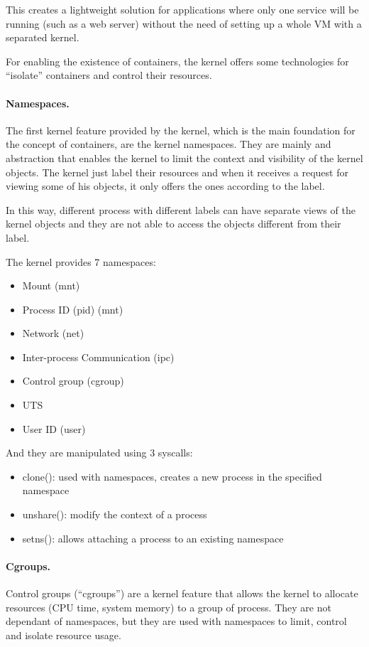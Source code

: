 This creates a lightweight solution for applications where only one service will be running (such as a web server) without the need of setting up a whole VM with a separated kernel.

For enabling the existence of containers, the kernel offers some technologies for ``isolate'' containers and control their resources.

\paragraph{Namespaces.} The first kernel feature provided by the kernel, which is the main foundation for the concept of containers, are the kernel namespaces.
They are mainly and abstraction that enables the kernel to limit the context and visibility of the kernel objects. The kernel just label their resources and when it receives a request for viewing some of his objects, it only offers the ones according to the label.

In this way, different process with different labels can have separate views of the kernel objects and they are not able to access the objects different from their label.

The kernel provides 7 namespaces:
\begin{itemize}
	\item{Mount (mnt)}
	\item{Process ID (pid) (mnt)}
	\item{Network (net)}
	\item{Inter-process Communication (ipc)}
	\item{Control group (cgroup)}
	\item{UTS}
	\item{User ID (user)}
\end{itemize}

And they are manipulated using 3 syscalls:
\begin{itemize}
	\item{clone(): used with namespaces, creates a new process in the specified namespace}
	\item{unshare(): modify the context of a process}
	\item{setns(): allows attaching a process to an existing namespace}
\end{itemize}

\paragraph{Cgroups.} Control groups (``cgroups'') are a kernel feature that allows the kernel to allocate resources (CPU time, system memory) to a group of process. They are not dependant of namespaces, but they are used with namespaces to limit, control and isolate resource usage.


